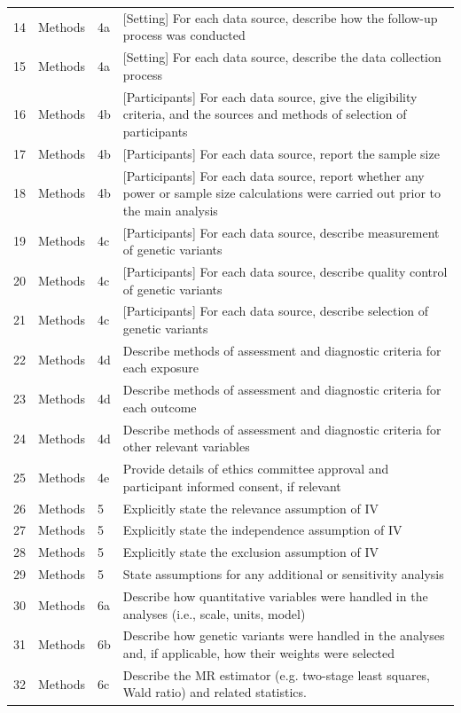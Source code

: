 \begin{longtable}{@{}lll p{9cm}@{}}
14 & Methods & 4a & [Setting] For each data source, describe how the follow-up process was conducted  \\
15 & Methods & 4a & [Setting] For each data source, describe the data collection process \\
16 & Methods & 4b & [Participants] For each data source, give the eligibility criteria, and the sources and methods of selection of participants \\
17 & Methods & 4b & [Participants] For each data source, report the sample size \\
18 & Methods & 4b & [Participants] For each data source, report whether any power or sample size calculations were carried out prior to the main analysis \\
19 & Methods & 4c & [Participants] For each data source, describe measurement of genetic variants \\
20 & Methods & 4c & [Participants] For each data source,  describe quality control of genetic variants \\
21 & Methods & 4c & [Participants] For each data source, describe  selection of genetic variants \\
22 & Methods & 4d & Describe methods of assessment and diagnostic criteria for each exposure \\
23 & Methods & 4d & Describe methods of assessment and diagnostic criteria for each outcome \\
24 & Methods & 4d & Describe methods of assessment and diagnostic criteria for other relevant variables \\
25 & Methods & 4e & Provide details of ethics committee approval and participant informed consent, if relevant \\
26 & Methods & 5 & Explicitly state the relevance assumption of IV \\
27 & Methods & 5 & Explicitly state the independence assumption of IV \\
28 & Methods & 5 & Explicitly state the exclusion assumption of IV \\
29 & Methods & 5 & State assumptions for any additional or sensitivity analysis \\
30 & Methods & 6a & Describe how quantitative variables were handled in the analyses (i.e., scale, units, model) \\
31 & Methods & 6b & Describe how genetic variants were handled in the analyses and, if applicable, how their weights were selected \\
32 & Methods & 6c & Describe the MR estimator (e.g. two-stage least squares, Wald ratio) and related statistics. \\

\end{longtable}

